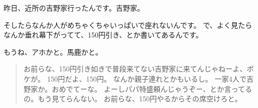 \documentclass[%
autodetect-engine,dvi=dvipdfmx,%
ja=standard,%
a4paper,papersize,%
jbase=12Q,%
jafont=ipaex,%
japaram={jis2004},%
japaram={units},%
enablejfam=true,%
hiresbb,%
oneside,%
\ifdefined\twocol
twocolumn,%
\fi
fleqn%
leqno,%
\ifdefined\landscape
landscape,%
\fi
]{bxjsarticle}
\begin{document}
%
%
%
昨日、近所の吉野家行ったんです。吉野家。

そしたらなんか人がめちゃくちゃいっぱいで座れないんです。
で、よく見たらなんか垂れ幕下がってて、150円引き、とか書いてあるんです。

もうね、アホかと。馬鹿かと。
\begin{verse}
お前らな、150円引き如きで普段来てない吉野家に来てんじゃねーよ、ボケが。
150円だよ、150円。
なんか親子連れとかもいるし。
一家4人で吉野家か。おめでてーな。
よーしパパ特盛頼んじゃうぞー、とか言ってるの。もう見てらんない。
お前らな、150円やるからその席空けろと。
\end{verse}
\end{document}
